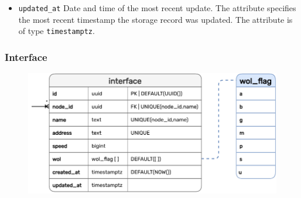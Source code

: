 \begin{itemize}
  \item \texttt{updated\_at}
    \newline
    Date and time of the most recent update.
    \newline
    The attribute specifies the most recent timestamp the storage record was updated.
    \newline
    The attribute is of type \texttt{timestamptz}.
\end{itemize}

\subsubsection{Interface}
\label{subsubsec:implementation_server_database_interface}

\begin{figure}[htbp]
  \centering
  \includegraphics[width=.75\textwidth]{images/implementation/erm_interface.pdf}
\end{figure}

